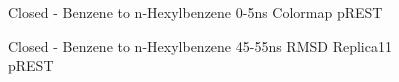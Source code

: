 \documentclass[journal=jctcce,manuscript=article]{achemso}
\begin{document}
\begin{figure}[!ht]
   \caption{Closed - Benzene to n-Hexylbenzene 0-5ns Colormap pREST}
   \label{fig:c_opls3_rest1_1/colormap}
\end{figure}

\begin{figure}[!ht]
   \caption{Closed - Benzene to n-Hexylbenzene 45-55ns RMSD Replica11 pREST}
   \label{fig:c_opls3_rest1_1/45-55ns/RMSD-replica11}
\end{figure}
\end{document}
